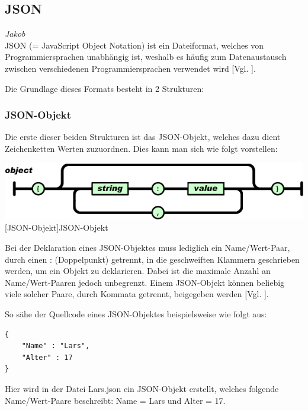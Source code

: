 \documentclass[12pt,a4paper,bibliography=totocnumbered,listof=totocnumbered]{scrartcl}
\begin{document}
\begin{minipage}{\linewidth}
\subsection{JSON}
\label{sec:JSON}
\emph{Jakob}\\
JSON (= JavaScript Object Notation) ist ein Dateiformat, welches von Programmiersprachen unabhängig ist, weshalb es häufig zum Datenaustausch zwischen verschiedenen Programmiersprachen verwendet wird [Vgl. \cite{json}].

Die Grundlage dieses Formats besteht in 2 Strukturen:

\subsubsection{JSON-Objekt}
\label{sec:JSON-Objekt}
Die erste dieser beiden Strukturen ist das JSON-Objekt, welches dazu dient Zeichenketten Werten zuzuordnen.
Dies kann man sich wie folgt vorstellen:


\vspace{1em}
\begin{minipage}{\linewidth}
	\centering
	\includegraphics[width=0.9\linewidth]{Bilder/json-object.png}
	[JSON-Objekt]{JSON-Objekt\footnotemark }
	\label{fig:json-objekt}
\end{minipage}

Bei der Deklaration eines JSON-Objektes muss lediglich ein Name/Wert-Paar, durch einen \glqq :\grqq{} (Doppelpunkt) getrennt, in die geschweiften Klammern geschrieben werden, um ein Objekt zu deklarieren.
Dabei ist die maximale Anzahl an Name/Wert-Paaren jedoch unbegrenzt. Einem JSON-Objekt können beliebig viele solcher Paare, durch Kommata getrennt, beigegeben werden [Vgl. \cite{json}].

So sähe der Quellcode eines JSON-Objektes beispielsweise wie folgt aus:
\\
\vspace{1em}
\begin{lstlisting}[caption=Lars.json, label=lst:json-objekt]
{
	"Name" : "Lars",
	"Alter" : 17
}
\end{lstlisting}
Hier wird in der Datei \glqq Lars.json\grqq{} ein JSON-Objekt erstellt, welches folgende Name/Wert-Paare beschreibt:
Name = Lars und Alter = 17.


\end{minipage}
\end{document}
